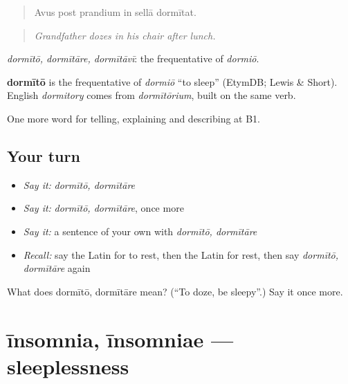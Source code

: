 \begin{quote}
Avus post prandium in sellā dormītat.
\end{quote}

\begin{quote}
\emph{Grandfather dozes in his chair after lunch.}
\end{quote}

\emph{dormītō, dormītāre, dormītāvī}: the frequentative of \emph{dormiō}.

\begin{cousinweb}
\textbf{dormītō} is the frequentative of \emph{dormiō} \textquotedblleft{}to sleep\textquotedblright{} (EtymDB; Lewis \& Short). English \emph{dormitory} comes from \emph{dormītōrium}, built on the same verb.
\end{cousinweb}

\begin{grammarlens}[title={What you've built}]
One more word for telling, explaining and describing at B1.
\end{grammarlens}

\subsection*{Your turn}
\begin{itemize}
\raggedright
  \item \emph{Say it:} \emph{dormītō, dormītāre}
  \item \emph{Say it:} \emph{dormītō, dormītāre}, once more
  \item \emph{Say it:} a sentence of your own with \emph{dormītō, dormītāre}
  \item \emph{Recall:} say the Latin for to rest, then the Latin for rest, then say \emph{dormītō, dormītāre} again
\end{itemize}

\begin{tcolorbox}[breakable,colback=teal!4,colframe=teal!35!black,title={Before you move on}]
What does dormītō, dormītāre mean? (\textquotedblleft{}To doze, be sleepy\textquotedblright{}.) Say it once more.
\end{tcolorbox}
\section[īnsomnia, īnsomniae]{īnsomnia, īnsomniae — sleeplessness}

\label{lesson:LA-C527-insomnia}



